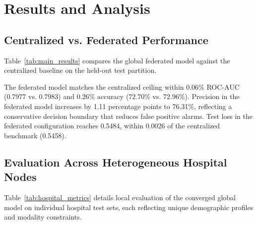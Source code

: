 \documentclass[10pt,conference]{IEEEtran}
\begin{document}
\section{Results and Analysis}

\subsection{Centralized vs. Federated Performance}
Table~\ref{tab:main_results} compares the global federated model against the centralized baseline on the held-out test partition. 

\begin{table}[!htbp]
\centering
\caption{Performance comparison between Centralized Baseline and Multimodal Federated Learning on the 13,737 held-out test samples.}
\label{tab:main_results}
\end{table}

The federated model matches the centralized ceiling within 0.06\% ROC-AUC (0.7977 vs. 0.7983) and 0.26\% accuracy (72.70\% vs. 72.96\%). Precision in the federated model increases by 1.11 percentage points to 76.31\%, reflecting a conservative decision boundary that reduces false positive alarms. Test loss in the federated configuration reaches 0.5484, within 0.0026 of the centralized benchmark (0.5458).

\subsection{Evaluation Across Heterogeneous Hospital Nodes}
Table~\ref{tab:hospital_metrics} details local evaluation of the converged global model on individual hospital test sets, each reflecting unique demographic profiles and modality constraints.
\end{document}
